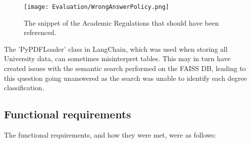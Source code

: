 \begin{figure}[H]
    \centering
    \texttt{[image: Evaluation/WrongAnswerPolicy.png]}
    \caption{The snippet of the Academic Regulations that should have been referenced. \autocite{bcuPoliciesProcedures} \label{fig:WrongAnswer2Snippet}}
\end{figure}

\noindent The 'PyPDFLoader' class in LangChain, which was used when storing all University data, can sometimes misinterpret tables. 
This may in turn have created issues with the semantic search performed on the FAISS DB, leading to this question going unanswered as 
the search was unable to identify each degree classification.


\subsection{Functional requirements} 
The functional requirements, and how they were met, were as follows:

